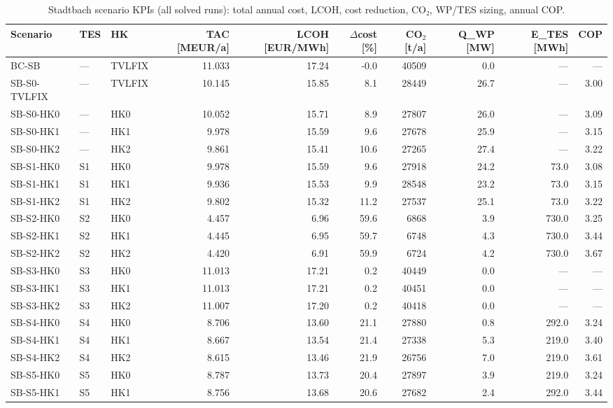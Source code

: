 \begin{table}[htbp]
  \centering
  \caption{Stadtbach scenario KPIs (all solved runs): total annual cost, LCOH, cost reduction, CO₂, WP/TES sizing, annual COP.}
  \label{tab:tab_T3_stadtbach_kpis}
  \begin{tabular}{ll lrrrrrrr}
  \toprule
  Scenario & TES & HK & TAC [MEUR/a] & LCOH [EUR/MWh] & $\Delta$cost [\%] & CO$_2$ [t/a] & Q\_WP [MW] & E\_TES [MWh] & COP \\
  \midrule
  BC-SB & — & TVLFIX & 11.033 & 17.24 & -0.0 & 40509 & 0.0 & — & — \\
  SB-S0-TVLFIX & — & TVLFIX & 10.145 & 15.85 & 8.1 & 28449 & 26.7 & — & 3.00 \\
  SB-S0-HK0 & — & HK0 & 10.052 & 15.71 & 8.9 & 27807 & 26.0 & — & 3.09 \\
  SB-S0-HK1 & — & HK1 & 9.978 & 15.59 & 9.6 & 27678 & 25.9 & — & 3.15 \\
  SB-S0-HK2 & — & HK2 & 9.861 & 15.41 & 10.6 & 27265 & 27.4 & — & 3.22 \\
  SB-S1-HK0 & S1 & HK0 & 9.978 & 15.59 & 9.6 & 27918 & 24.2 & 73.0 & 3.08 \\
  SB-S1-HK1 & S1 & HK1 & 9.936 & 15.53 & 9.9 & 28548 & 23.2 & 73.0 & 3.15 \\
  SB-S1-HK2 & S1 & HK2 & 9.802 & 15.32 & 11.2 & 27537 & 25.1 & 73.0 & 3.22 \\
  SB-S2-HK0 & S2 & HK0 & 4.457 & 6.96 & 59.6 & 6868 & 3.9 & 730.0 & 3.25 \\
  SB-S2-HK1 & S2 & HK1 & 4.445 & 6.95 & 59.7 & 6748 & 4.3 & 730.0 & 3.44 \\
  SB-S2-HK2 & S2 & HK2 & 4.420 & 6.91 & 59.9 & 6724 & 4.2 & 730.0 & 3.67 \\
  SB-S3-HK0 & S3 & HK0 & 11.013 & 17.21 & 0.2 & 40449 & 0.0 & — & — \\
  SB-S3-HK1 & S3 & HK1 & 11.013 & 17.21 & 0.2 & 40451 & 0.0 & — & — \\
  SB-S3-HK2 & S3 & HK2 & 11.007 & 17.20 & 0.2 & 40418 & 0.0 & — & — \\
  SB-S4-HK0 & S4 & HK0 & 8.706 & 13.60 & 21.1 & 27880 & 0.8 & 292.0 & 3.24 \\
  SB-S4-HK1 & S4 & HK1 & 8.667 & 13.54 & 21.4 & 27338 & 5.3 & 219.0 & 3.40 \\
  SB-S4-HK2 & S4 & HK2 & 8.615 & 13.46 & 21.9 & 26756 & 7.0 & 219.0 & 3.61 \\
  SB-S5-HK0 & S5 & HK0 & 8.787 & 13.73 & 20.4 & 27897 & 3.9 & 219.0 & 3.24 \\
  SB-S5-HK1 & S5 & HK1 & 8.756 & 13.68 & 20.6 & 27682 & 2.4 & 292.0 & 3.44 \\

\end{tabular}
\end{table}
